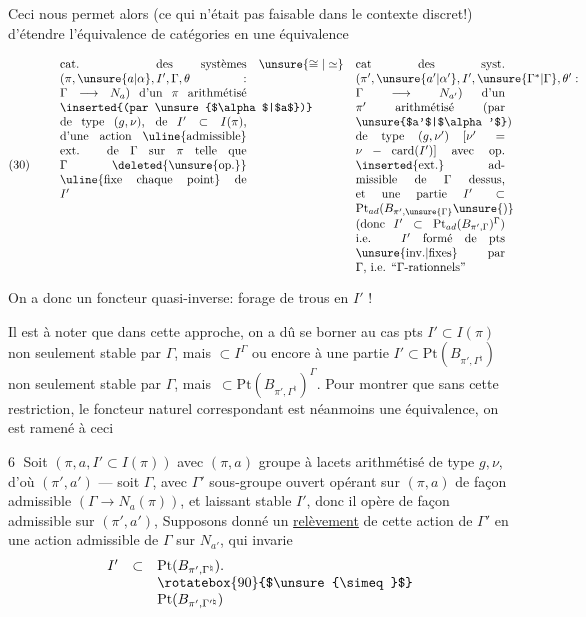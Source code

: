 Ceci nous permet alors (ce qui n'était pas faisable dans le contexte
discret!) d'étendre l'équivalence de catégories en une équivalence

\[
(30)\qquad
\begin{array}{c@{\quad}c@{\quad}c}
\parbox[t]{0.45\linewidth}{%
cat. des systèmes $(\pi,\unsure{a|\alpha},I',\Gamma,\theta:\Gamma\longrightarrow N_a)$
d'un $\pi$ arithmétisé \inserted{(par \unsure{$\alpha$|$a$})} de type $(g,\nu)$,
de $I'\subset I(\pi)$, d'une action
\uline{admissible} ext. de $\Gamma$ sur $\pi$
telle que $\Gamma$ \deleted{\unsure{op.}} \uline{fixe chaque point} de $I'$
}
& \unsure{\cong|\simeq} &
\parbox[t]{0.36\linewidth}{%
cat des syst.
$(\pi',\unsure{a'|\alpha'},I',\unsure{\Gamma^{*}|\Gamma},\theta':\Gamma\longrightarrow N_{a'})$
d'un $\pi'$ arithmétisé (par \unsure{$a'$|$\alpha'$}) de type
$(g,\nu')$ $[\nu'=\nu-\mathrm{card}(I')]$
avec op. \inserted{ext.} admissible de $\Gamma$ dessus, et
une partie $I'\subset\mathrm{Pt}_{ad}(B_{\pi',\unsure{\Gamma}}\unsure{)}$
(donc $I'\subset\mathrm{Pt}_{ad}(B_{\pi',\Gamma})^\Gamma$)
i.e. $I'$ formé de pts \unsure{inv.|fixes} par $\Gamma$, i.e. ``$\Gamma$-rationnels''
}
\end{array}
\]


On a donc un foncteur quasi-inverse:
forage de trous en $I'$ !


Il est à noter que dans cette approche, on a dû se borner au cas
  pts 
$I'\subset I(\pi)$ non seulement stable par $\Gamma$, mais
 $\subset I^\Gamma$
 ou encore à une partie
$I'\subset\mathrm{Pt}(B_{\pi',\Gamma^{\natural}})$
non seulement stable par $\Gamma$, mais
\,$\subset\mathrm{Pt}(B_{\pi',\Gamma^{\natural}})^\Gamma$.
Pour montrer que sans cette restriction, le foncteur naturel
 correspondant est néanmoins
une équivalence, on est ramené à ceci

\textcircled{6} Soit $(\pi,a,I'\subset I(\pi))$ avec $(\pi,a)$
groupe à lacets   arithmétisé de type
$g,\nu$, d'où $(\pi',a')$ --- soit $\Gamma$, avec $\Gamma'$
sous-groupe ouvert opérant sur $(\pi,a)$ de façon admissible
$(\Gamma\longrightarrow N_a(\pi))$,
et laissant stable $I'$, donc il opère de façon admissible sur
$(\pi',a')$,
Supposons donné un \uline{relèvement} de cette action de $\Gamma'$
en une action admissible de $\Gamma$ sur $N_{a'}$, qui invarie
\[
\begin{array}{rcl}
I'&\subset&\mathrm{Pt}(B_{\pi',\Gamma^{\natural}}).\\
&&\rotatebox{90}{$\unsure{\simeq}$}\\
&&\mathrm{Pt}(B_{\pi',\Gamma^{\prime\natural}})
\end{array}
\]

